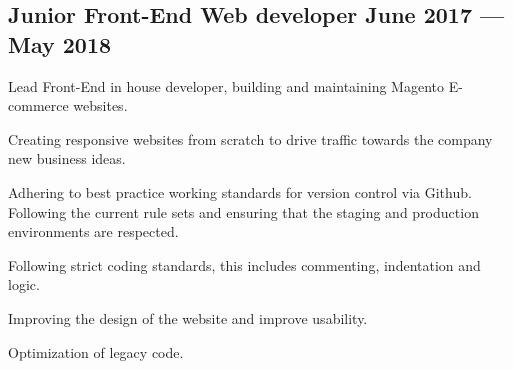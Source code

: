 \subsection{{Junior Front-End Web developer \hfill June 2017 --- May 2018}}
\begin{zitemize}
\item Lead Front-End in house developer, building and maintaining Magento E-commerce websites.
\item Creating responsive websites from scratch to drive traffic towards the company new business ideas.
\item Adhering to best practice working standards for version control via Github. Following the current rule sets and ensuring that the staging and production environments are respected.
\item Following strict coding standards, this includes commenting, indentation and logic.
\item Improving the design of the website and improve usability.
\item Optimization of legacy code.
\end{zitemize}

